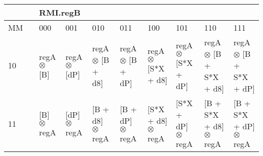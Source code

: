 \documentclass{article}
\begin{document}
\begin{adjustbox}{width=1\textwidth}
\begin{tabular}{|ll|llllllll|}
\multicolumn{2}{|l|}{}                               & \multicolumn{8}{l|}{RMI.regB}                                                                                                                                                                                                                                                                                                                                                                                                                                                                  \\ \hline
\multicolumn{1}{|l|}{MM}                  &          & \multicolumn{1}{l|}{000}                             & \multicolumn{1}{l|}{001}                             & \multicolumn{1}{l|}{010}                                & \multicolumn{1}{l|}{011}                                & \multicolumn{1}{l|}{100}                                           & \multicolumn{1}{l|}{101}                                           & \multicolumn{1}{l|}{110}                                           & 111                                           \\ \hline
\multicolumn{1}{|l|}{10}                  &          & \multicolumn{1}{l|}{regA $\otimes$ {[}B{]}}          & \multicolumn{1}{l|}{regA $\otimes$ {[}dP{]}}         & \multicolumn{1}{l|}{regA $\otimes$ {[}B + d8{]}}        & \multicolumn{1}{l|}{regA $\otimes$ {[}B + dP{]}}        & \multicolumn{1}{l|}{regA $\otimes$ {[}S*X + d8{]}}                 & \multicolumn{1}{l|}{regA $\otimes$ {[}S*X + dP{]}}                 & \multicolumn{1}{l|}{regA $\otimes$ {[}B + S*X + d8{]}}             & regA $\otimes$ {[}B + S*X + dP{]}             \\ \hline
\multicolumn{1}{|l|}{11}                  &          & \multicolumn{1}{l|}{{[}B{]} $\otimes$ regA}          & \multicolumn{1}{l|}{{[}dP{]} $\otimes$ regA}         & \multicolumn{1}{l|}{{[}B + d8{]} $\otimes$ regA}        & \multicolumn{1}{l|}{{[}B + dP{]} $\otimes$ regA}        & \multicolumn{1}{l|}{{[}S*X + d8{]} $\otimes$ regA}                 & \multicolumn{1}{l|}{{[}S*X + dP{]} $\otimes$ regA}                 & \multicolumn{1}{l|}{{[}B + S*X + d8{]} $\otimes$ regA}             & {[}B + S*X + dP{]} $\otimes$ regA             \\ \hline
\end{tabular}
\end{adjustbox}
\end{document}
